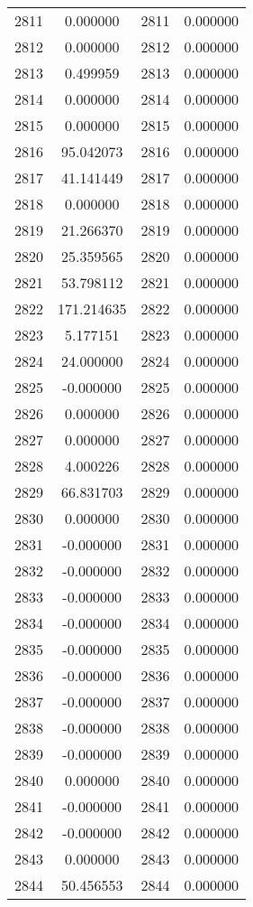 \documentclass[12pt]{article}
\begin{document}
\begin{longtable}{@{}cccc@{}}
2811 & 0.000000 & 2811 & 0.000000 \\
2812 & 0.000000 & 2812 & 0.000000 \\
2813 & 0.499959 & 2813 & 0.000000 \\
2814 & 0.000000 & 2814 & 0.000000 \\
2815 & 0.000000 & 2815 & 0.000000 \\
2816 & 95.042073 & 2816 & 0.000000 \\
2817 & 41.141449 & 2817 & 0.000000 \\
2818 & 0.000000 & 2818 & 0.000000 \\
2819 & 21.266370 & 2819 & 0.000000 \\
2820 & 25.359565 & 2820 & 0.000000 \\
2821 & 53.798112 & 2821 & 0.000000 \\
2822 & 171.214635 & 2822 & 0.000000 \\
2823 & 5.177151 & 2823 & 0.000000 \\
2824 & 24.000000 & 2824 & 0.000000 \\
2825 & -0.000000 & 2825 & 0.000000 \\
2826 & 0.000000 & 2826 & 0.000000 \\
2827 & 0.000000 & 2827 & 0.000000 \\
2828 & 4.000226 & 2828 & 0.000000 \\
2829 & 66.831703 & 2829 & 0.000000 \\
2830 & 0.000000 & 2830 & 0.000000 \\
2831 & -0.000000 & 2831 & 0.000000 \\
2832 & -0.000000 & 2832 & 0.000000 \\
2833 & -0.000000 & 2833 & 0.000000 \\
2834 & -0.000000 & 2834 & 0.000000 \\
2835 & -0.000000 & 2835 & 0.000000 \\
2836 & -0.000000 & 2836 & 0.000000 \\
2837 & -0.000000 & 2837 & 0.000000 \\
2838 & -0.000000 & 2838 & 0.000000 \\
2839 & -0.000000 & 2839 & 0.000000 \\
2840 & 0.000000 & 2840 & 0.000000 \\
2841 & -0.000000 & 2841 & 0.000000 \\
2842 & -0.000000 & 2842 & 0.000000 \\
2843 & 0.000000 & 2843 & 0.000000 \\
2844 & 50.456553 & 2844 & 0.000000 \\

\end{longtable}
\end{document}
